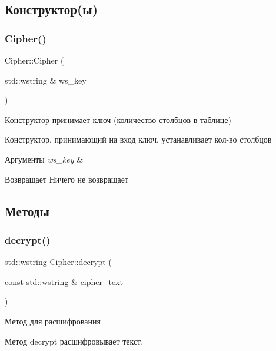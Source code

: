 \subsection{Конструктор(ы)}
\mbox{\label{classCipher_a876edcc7064f450935baedce442f1556}} 
\subsubsection{\texorpdfstring{Cipher()}{Cipher()}}
{\footnotesize\ttfamily Cipher\+::\+Cipher (\begin{DoxyParamCaption}\item[{std\+::wstring \&}]{ws\+\_\+key }\end{DoxyParamCaption})}



Конструктор принимает ключ (количество столбцов в таблице) 

Конструктор, принимающий на вход ключ, устанавливает кол-\/во столбцов


\begin{DoxyParams}{Аргументы}
{\em ws\+\_\+key} & \\
\hline
\end{DoxyParams}
\begin{DoxyReturn}{Возвращает}
Ничего не возвращает 
\end{DoxyReturn}


\subsection{Методы}
\mbox{\label{classCipher_accb629416e343719818e557b8eb994dd}} 
\subsubsection{\texorpdfstring{decrypt()}{decrypt()}}
{\footnotesize\ttfamily std\+::wstring Cipher\+::decrypt (\begin{DoxyParamCaption}\item[{const std\+::wstring \&}]{cipher\+\_\+text }\end{DoxyParamCaption})}



Метод для расшифрования 

Метод decrypt расшифровывает текст.


